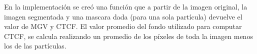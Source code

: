 En la implementación se creó una función que a partir de la imagen original, la imagen segmentada y una mascara dada (para una sola partícula) devuelve el valor de MGV y CTCF. El valor promedio del fondo utilizado para computar CTCF, se calcula realizando un promedio de los píxeles de toda la imagen menos los de las partículas.

